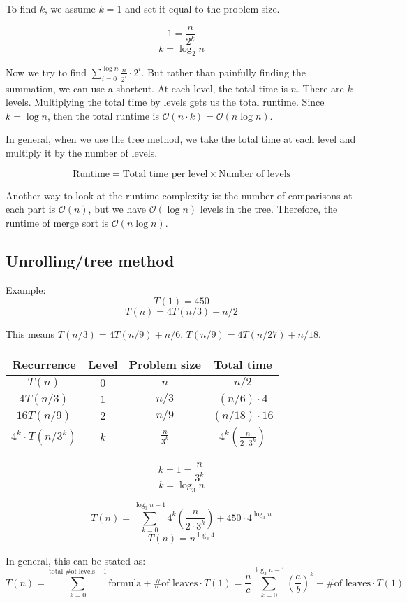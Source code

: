 \documentclass{article}
\newcommand{\Oh}{\mathcal{O}}
\begin{document}
To find $k$, we assume $k = 1$ and set it equal to the problem size.

$$1 = \frac{n}{2^k}$$
$$k = \log_2 n$$

Now we try to find $\sum_{i = 0}^{\log n} \frac{n}{2^i} \cdot 2^i$. But rather than painfully finding the summation, we can use a shortcut. At each level, the total time is $n$. There are $k$ levels. Multiplying the total time by levels gets us the total runtime. Since $k = \log n$, then the total runtime is $\Oh(n \cdot k) = \Oh(n \log n)$.

In general, when we use the tree method, we take the total time at each level and multiply it by the number of levels.

$$\text{Runtime} = \text{Total time per level} \times \text{Number of levels}$$

Another way to look at the runtime complexity is: the number of comparisons at each part is $\Oh(n)$, but we have $\Oh(\log n)$ levels in the tree. Therefore, the runtime of merge sort is $\Oh(n \log n)$.

\subsection{Unrolling/tree method}
Example:
$$T(1) = 450$$
$$T(n) = 4T(n/3) + n/2$$

This means $T(n/3) = 4T(n/9) + n/6$. $T(n/9) = 4T(n/27) + n/18$.

\begin{tabular}{|c|c|c|c|}
    \hline
    \textbf{Recurrence} & \textbf{Level} & \textbf{Problem size} & \textbf{Total time}\\ \hline
    $T(n)$ & $0$ & $n$ & $n/2$\\ \hline
    $4T(n/3)$ & $1$ & $n/3$ & $(n/6) \cdot 4$\\ \hline
    $16 T(n/9)$ & $2$ & $n/9$ & $(n/18) \cdot 16$\\ \hline
    $4^k \cdot T(n/3^k)$ & $k$ & $\frac{n}{3^k}$ & $4^k (\frac{n}{2 \cdot 3^k})$ \\ \hline
\end{tabular}

$$k = 1 = \frac{n}{3^k}$$
$$k = \log_3 n$$

$$T(n) = \sum_{k = 0}^{\log_3 n - 1} 4^k \left(\frac{n}{2 \cdot 3^k}\right) + 450 \cdot 4^{\log_3 n}$$
$$T(n) = n^{\log_3 4}$$

In general, this can be stated as:
$$T(n) = \sum_{k = 0}^{\text{total \# of levels} - 1} \textrm{formula} + \text{\# of leaves} \cdot T(1) = \frac{n}{c} \sum_{k = 0}^{\log_3 n - 1} \left(\frac{a}{b}\right)^k + \text{\# of leaves} \cdot T(1)$$
\end{document}
